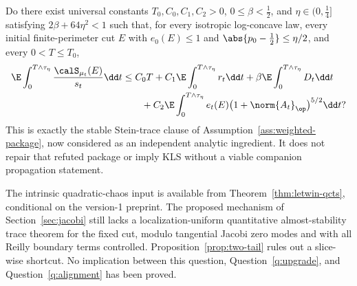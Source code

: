 \documentclass[../../main.tex]{subfiles}
\begin{document}
\begin{question}
\label{q:stein-weighted}
Do there exist universal constants $T_0,C_0,C_1,C_2>0$,
$0\le\beta<\tfrac12$, and $\eta\in(0,\tfrac14]$ satisfying
$2\beta+64\eta^2<1$ such that, for every isotropic log-concave law, every initial
finite-perimeter cut $E$ with $e_0(E)\le1$ and
$\abs{p_0-\tfrac12}\le\eta/2$, and every $0<T\le T_0$,
\[
\begin{aligned}
  \E\int_0^{T\wedge\tau_\eta}\frac{\calS_{\mu_t}(E)}{s_t}\dd t
  &\le C_0T+C_1\E\int_0^{T\wedge\tau_\eta}r_t\dd t
  +\beta\E\int_0^{T\wedge\tau_\eta}D_t\dd t \\
  &\qquad
  +C_2\E\int_0^{T\wedge\tau_\eta}
    e_t(E)\bigl(1+\norm{A_t}_\op\bigr)^{5/2}\dd t?
\end{aligned}
\]
This is exactly the stable Stein-trace clause of
Assumption~\ref{ass:weighted-package}, now considered as an independent analytic ingredient.
It does not repair that refuted package or imply KLS without a viable companion propagation
statement.

The intrinsic quadratic-chaos input is available from
Theorem~\ref{thm:letwin-qcts}, conditional on the version-1 preprint. The proposed mechanism of
Section~\ref{sec:jacobi} still lacks a localization-uniform quantitative almost-stability trace
theorem for the fixed cut, modulo tangential Jacobi zero modes and with all Reilly boundary terms
controlled. Proposition~\ref{prop:two-tail} rules out a slice-wise shortcut. No implication
between this question, Question~\ref{q:upgrade}, and Question~\ref{q:alignment} has been proved.
\end{question}
\end{document}
